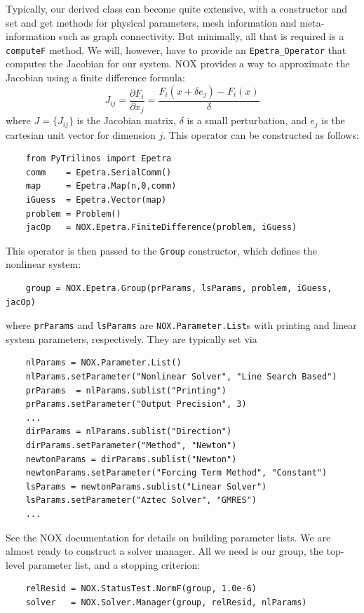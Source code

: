 \documentclass[acmtocl]{acmtrans2m}
\begin{document}
Typically, our derived class can become quite extensive, with a
constructor and set and get methods for physical parameters, mesh
information and meta-information such as graph connectivity.  But
minimally, all that is required is a {\tt computeF} method.  We will,
however, have to provide an {\tt Epetra\_Operator} that computes the
Jacobian for our system.  NOX provides a way to approximate the
Jacobian using a finite difference formula:
\begin{equation}
  J_{ij} = \frac{\partial F_i}{\partial x_j} = \frac{F_i(x+\delta e_j)
    - F_i(x)}{\delta}
\end{equation}
where $J=\{J_{ij}\}$ is the Jacobian matrix, $\delta$ is a small
perturbation, and $e_j$ is the cartesian unit vector for dimension
$j$.  This operator can be constructed as follows:
\begin{verbatim}
    from PyTrilinos import Epetra
    comm    = Epetra.SerialComm()
    map     = Epetra.Map(n,0,comm)
    iGuess  = Epetra.Vector(map)
    problem = Problem()
    jacOp   = NOX.Epetra.FiniteDifference(problem, iGuess)
\end{verbatim}
This operator is then passed to the {\tt Group} constructor, which
defines the nonlinear system:
\begin{verbatim}
    group = NOX.Epetra.Group(prParams, lsParams, problem, iGuess, jacOp)
\end{verbatim}
where {\tt prParams} and {\tt lsParams} are {\tt NOX.Parameter.List}s
with printing and linear system parameters, respectively.  They are
typically set via
\begin{verbatim}
    nlParams = NOX.Parameter.List()
    nlParams.setParameter("Nonlinear Solver", "Line Search Based")
    prParams  = nlParams.sublist("Printing")
    prParams.setParameter("Output Precision", 3)
    ...
    dirParams = nlParams.sublist("Direction")
    dirParams.setParameter("Method", "Newton")
    newtonParams = dirParams.sublist("Newton")
    newtonParams.setParameter("Forcing Term Method", "Constant")
    lsParams = newtonParams.sublist("Linear Solver")
    lsParams.setParameter("Aztec Solver", "GMRES")
    ...
\end{verbatim}
See the NOX documentation for details on building parameter lists.  We
are almost ready to construct a solver manager.  All we need is our
group, the top-level parameter list, and a stopping criterion:
\begin{verbatim}
    relResid = NOX.StatusTest.NormF(group, 1.0e-6)
    solver   = NOX.Solver.Manager(group, relResid, nlParams)
\end{verbatim}
\end{document}

